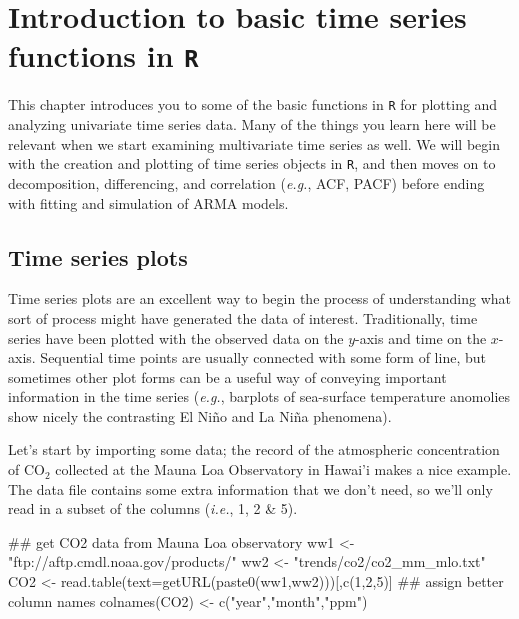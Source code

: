 

\setcounter{MaxMatrixCols}{20}
\usepackage{enumerate}
\usepackage{Sweave}





\chapter{Introduction to basic time series functions in \texttt{R}}
\label{chap:introTS}

This chapter introduces you to some of the basic functions in \texttt{R} for plotting and analyzing univariate time series data.  Many of the things you learn here will be relevant when we start examining multivariate time series as well.  We will begin with the creation and plotting of time series objects in \texttt{R}, and then moves on to decomposition, differencing, and correlation (\emph{e.g.}, ACF, PACF) before ending with fitting and simulation of ARMA models.

\section{Time series plots}

Time series plots are an excellent way to begin the process of understanding what sort of process might have generated the data of interest.  Traditionally, time series have been plotted with the observed data on the $y$-axis and time on the $x$-axis.  Sequential time points are usually connected with some form of line, but sometimes other plot forms can be a useful way of conveying important information in the time series (\emph{e.g.}, barplots of sea-surface temperature anomolies show nicely the contrasting El Ni{\~n}o and La Ni{\~n}a phenomena).

Let's start by importing some data; the record of the atmospheric concentration of CO$_2$ collected at the Mauna Loa Observatory in Hawai'i makes a nice example.  The data file contains some extra information that we don't need, so we'll only read in a subset of the columns (\emph{i.e.}, 1, 2 \& 5).

\begin{Schunk}
\begin{Sinput}
 ## get CO2 data from Mauna Loa observatory
 ww1 <- "ftp://aftp.cmdl.noaa.gov/products/"
 ww2 <- "trends/co2/co2_mm_mlo.txt"
 CO2 <- read.table(text=getURL(paste0(ww1,ww2)))[,c(1,2,5)]
 ## assign better column names
 colnames(CO2) <- c("year","month","ppm")
\end{Sinput}
\end{Schunk}
